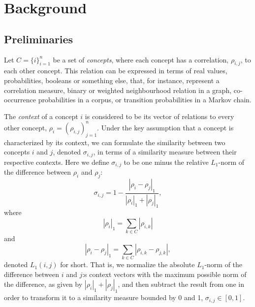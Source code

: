 \documentclass{sig-alternate}
\newcommand{\comment}[1]{{\small \color{red} {#1}} \normalcolor}
\newcommand{\rn}[1]{\rho_{#1}}
\newcommand{\rns}[1]{|\rn{#1}|_1}
\newcommand{\sy}[1]{\sigma_{#1}}
\newcommand{\nm}[1]{L_1(#1)}
\newcommand{\dnm}[2]{|\rn{#1}-\rn{#2}|_1}
\begin{document}

\section{Background}

\subsection{Preliminaries}
\label{sec:preliminaries}

Let $C = \{i\}_{i=1}^n$ be a set of \emph{concepts}, where each concept has a correlation, $\rn{i,j}$, to
each other concept. This relation can be expressed in terms of real values, probabilities, booleans or something
else, that, for instance, represent a correlation measure, binary or weighted neighbourhood relation in a graph,
co-occurrence probabilities in a corpus, or transition probabilities in a Markov chain.

The \emph{context} of a concept $i$ is considered to be its vector of relations to every other concept, $\rn{i} =
(\rn{i,j})_{j=1}^n$. Under the key assumption that a concept is characterized by its context, we can formulate the
similarity between two concepts $i$ and $j$, denoted $\sy{i,j}$, in terms of a similarity measure between their
respective contexts.
Here we define $\sy{i,j}$ to be one minus the relative $L_1$-norm of the difference between $\rn{i}$ and $\rn{j}$:
\begin{equation}\label{eq:sim}
\sy{i,j} = 1 - \frac{\dnm{i}{j}}{\rns{i} + \rns{j}},
\end{equation}
where
\begin{equation}\label{eq:totrel}
\rns{i} = \sum_{k \in C} | \rn{i,k}|
\end{equation}
and
\begin{equation}\label{}
\dnm{i}{j} =  \sum_{k \in C} | \rn{i,k} - \rn{j,k} |,
\end{equation}
denoted $\nm{i,j}$ for short.
That is, we normalize the absolute $L_1$-norm of the difference between $i$ and $j$:s context vectors with the maximum
possible norm of the difference, as given by $\rns{i} + \rns{j}$, and then subtract the result from one in order to
transform it to a similarity measure bounded by 0 and 1, $\sy{i,j} \in [0, 1]$.%
\end{document}
